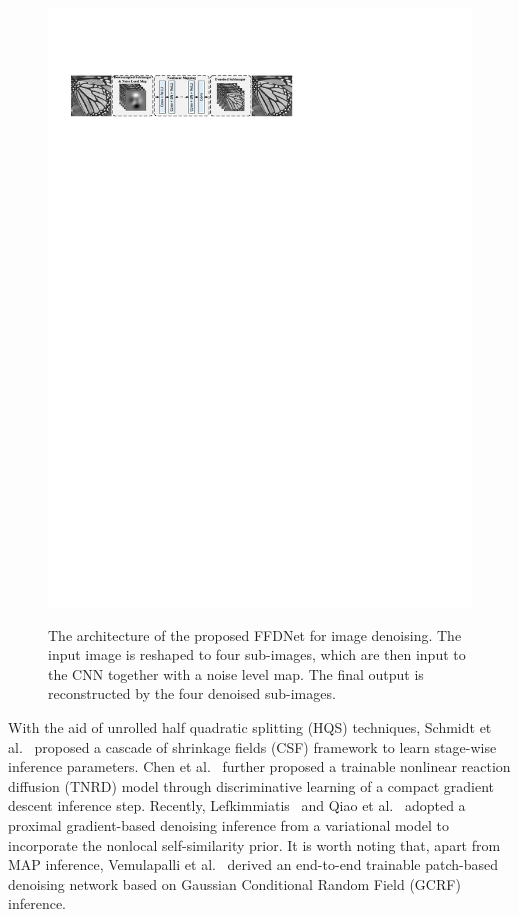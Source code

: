 \documentclass[journal]{IEEEtran}
\begin{document}
\begin{figure}[htbp]
  \centering
  \includegraphics[width=1\textwidth]{CNN6.pdf}\\
  \caption{The architecture of the proposed FFDNet for image denoising. The input image is reshaped to four sub-images, which are then input to the CNN together with a noise level map. The final output is reconstructed by the four denoised sub-images.}
  \label{fig1}\vspace{-0.1cm}
\end{figure}



With the aid of unrolled half quadratic splitting (HQS) techniques, Schmidt et al.~\cite{schmidt2014shrinkage,tuprints6044} proposed a cascade of shrinkage fields (CSF) framework to learn stage-wise inference parameters. Chen et al.~\cite{chen2015trainable} further proposed a trainable nonlinear reaction diffusion (TNRD) model through discriminative learning of a compact gradient descent inference step. Recently, Lefkimmiatis~\cite{lefkimmiatis2016non} and Qiao et al.~\cite{Qiao2017} adopted a proximal gradient-based denoising inference from a variational model to incorporate the nonlocal self-similarity prior. {It is worth noting that, apart from MAP inference, Vemulapalli et al.~\cite{Vemulapalli_2016_CVPR} derived an end-to-end trainable patch-based denoising network based on Gaussian Conditional Random Field (GCRF) inference.}
\end{document}
